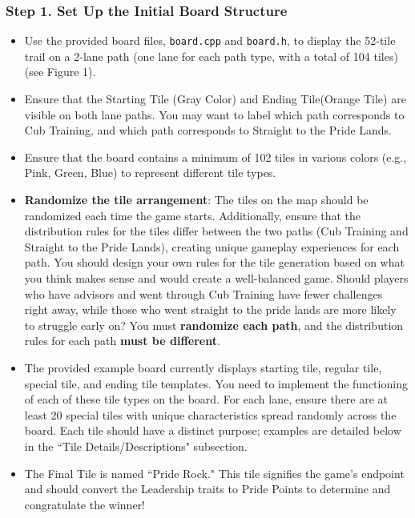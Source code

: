 \subsubsection{\textbf{Step 1. Set Up the Initial Board Structure}}
\begin{itemize}
    \item Use the provided board files, \verb|board.cpp| and \verb|board.h|, to display the 52-tile trail on a 2-lane path (one lane for each path type, with a total of 104 tiles) (see Figure 1). 
    \item Ensure that the Starting Tile (Gray Color) and Ending Tile(Orange Tile) are visible on both lane paths. You may want to label which path corresponds to Cub Training, and which path corresponds to Straight to the Pride Lands.
    \item Ensure that the board contains a minimum of 102 tiles in various colors (e.g., Pink, Green, Blue) to represent different tile types.
    \item \textbf{Randomize the tile arrangement}: The tiles on the map should be randomized each time the game starts. Additionally, ensure that the distribution rules for the tiles differ between the two paths (Cub Training and Straight to the Pride Lands), creating unique gameplay experiences for each path. You should design your own rules for the tile generation based on what you think makes sense and would create a well-balanced game. Should players who have advisors and went through Cub Training have fewer challenges right away, while those who went straight to the pride lands are more likely to struggle early on? You must \textbf{randomize each path}, and the distribution rules for each path \textbf{must be different}.
    \item The provided example board currently displays starting tile, regular tile, special tile, and ending tile templates. You need to implement the functioning of each of these tile types on the board. For each lane, ensure there are at least 20 special tiles with unique characteristics spread randomly across the board. Each tile should have a distinct purpose; examples are detailed below in the ``Tile Details/Descriptions" subsection.
    \item The Final Tile is named ``Pride Rock." This tile signifies the game's endpoint and should convert the Leadership traits to Pride Points to determine and congratulate the winner!
\end{itemize}

